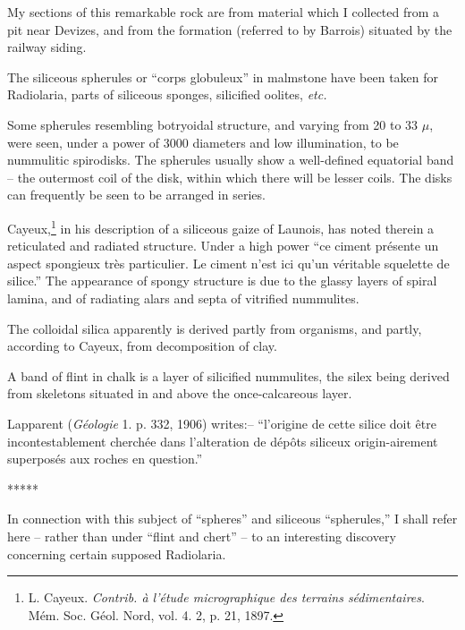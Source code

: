 \documentclass[a4paper, 12pt, oneside]{article}
\begin{document}
My sections of this remarkable rock are from material which I collected from a pit near Devizes, and from the formation (referred to by Barrois) situated by the railway siding.

The siliceous spherules or ``corps globuleux'' in malmstone have been taken for Radiolaria, parts of siliceous sponges, silicified oolites, \emph{etc.}

Some spherules resembling botryoidal structure, and varying from 20 to 33 $\mu$, were seen, under a power of 3000 diameters and low illumination, to be nummulitic spirodisks. The spherules usually show a well-defined equatorial band -- the outermost coil of the disk, within which there will be lesser coils. The disks can frequently be seen to be arranged in series.

Cayeux,\footnote{L. Cayeux. \emph{Contrib. à l'étude micrographique des terrains sédimentaires}. Mém. Soc. Géol. Nord, vol. 4. 2, p. 21, 1897.} in his description of a siliceous gaize of Launois, has noted therein a reticulated and radiated structure. Under a high power ``ce ciment présente un aspect spongieux très particulier. Le ciment n'est ici qu'un véritable squelette de silice.'' The appearance of spongy structure is due to the glassy layers of spiral lamina, and of radiating alars and septa of vitrified nummulites.

The colloidal silica apparently is derived partly from organisms, and partly, according to Cayeux, from decomposition of clay.

A band of flint in chalk is a layer of silicified nummulites, the silex being derived from skeletons situated in and above the once-calcareous layer.

Lapparent (\emph{Géologie} 1. p. 332, 1906) writes:-- ``l'origine de cette silice doit être incontestablement cherchée dans l'alteration de dépôts siliceux origin-airement superposés aux roches en question.''

\centerline{*\hspace{15mm}*\hspace{15mm}*\hspace{15mm}*\hspace{15mm}*}
\bigskip

In connection with this subject of ``spheres'' and siliceous ``spherules,'' I shall refer here -- rather than under ``flint and chert'' -- to an interesting discovery concerning certain supposed Radiolaria.
\end{document}
